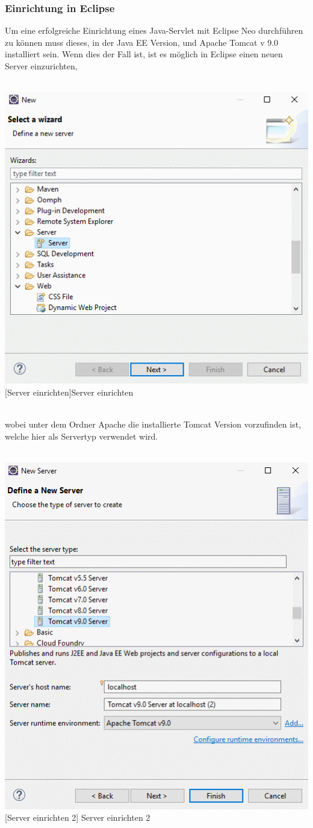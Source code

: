 \documentclass[12pt,a4paper,bibliography=totocnumbered,listof=totocnumbered]{scrartcl}
\begin{document}
\subsubsection{Einrichtung in Eclipse}
Um eine erfolgreiche Einrichtung eines Java-Servlet mit Eclipse Neo durchführen zu können muss dieses, in der Java EE Version, und Apache Tomcat v 9.0 installiert sein. 
Wenn dies der Fall ist, ist es möglich in Eclipse einen neuen Server einzurichten, \\
\\
\vspace{1em}
\begin{minipage}{\linewidth}
	\centering
	\includegraphics[width=0.7\linewidth]{Bilder/Eclipse-ServerErstellen.png}
    [Server einrichten]{Server einrichten}	
	\label{fig:eclipse1}
\end{minipage}
\\
wobei unter dem Ordner Apache die installierte Tomcat Version vorzufinden ist, welche hier  als Servertyp verwendet wird.\\
\\
\vspace{1em}
\begin{minipage}{\linewidth}
	\centering
	\includegraphics[width=0.7\linewidth]{Bilder/Eclipse-ServerErstellen1.png}
	[Server einrichten 2]	{Server einrichten 2}
	\label{fig:eclipse2}
\end{minipage}
\\
\end{document}
